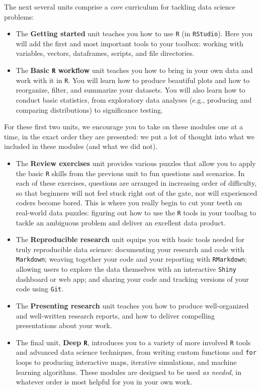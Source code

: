 \documentclass[]{book}
\begin{document}
The next several units comprise a \emph{core} curriculum for tackling data science problems:

\begin{itemize}
\item
  The \textbf{Getting started} unit teaches you how to use \texttt{R} (in \texttt{RStudio}). Here you will add the first and most important tools to your toolbox: working with variables, vectors, dataframes, scripts, and file directories.
\item
  The \textbf{Basic \texttt{R} workflow} unit teaches you how to bring in your own data and work with it in \texttt{R}. You will learn how to produce beautiful plots and how to reorganize, filter, and summarize your datasets. You will also learn how to conduct basic statistics, from exploratory data analyses (e.g., producing and comparing distributions) to significance testing.
\end{itemize}

For these first two units, we encourage you to take on these modules one at a time, in the exact order they are presented: we put a lot of thought into what we included in these modules (and what we did not).

\begin{itemize}
\item
  The \textbf{Review exercises} unit provides various puzzles that allow you to apply the basic \texttt{R} skills from the previous unit to fun questions and scenarios. In each of these exercises, questions are arranged in increasing order of difficulty, so that beginners will not feel stuck right out of the gate, nor will experienced coders become bored. This is where you really begin to cut your teeth on real-world data puzzles: figuring out how to use the \texttt{R} tools in your toolbag to tackle an ambiguous problem and deliver an excellent data product.
\item
  The \textbf{Reproducible research} unit equips you with basic tools needed for truly reproducible data science: documenting your research and code with \texttt{Markdown}; weaving together your code and your reporting with \texttt{RMarkdown};
  allowing users to explore the data themselves with an interactive \texttt{Shiny} dashboard or web app; and sharing your code and tracking versions of your code using \texttt{Git}.
\item
  The \textbf{Presenting research} unit teaches you how to produce well-organized and well-written research reports, and how to deliver compelling presentations about your work.
\item
  The final unit, \textbf{Deep \texttt{R}}, introduces you to a variety of more involved \texttt{R} tools and advanced data science techniques, from writing custom functions and \texttt{for} loops to producing interactive maps, iterative simulations, and machine learning algorithms. These modules are designed to be used \emph{as needed}, in whatever order is most helpful for you in your own work.
\end{itemize}
\end{document}
